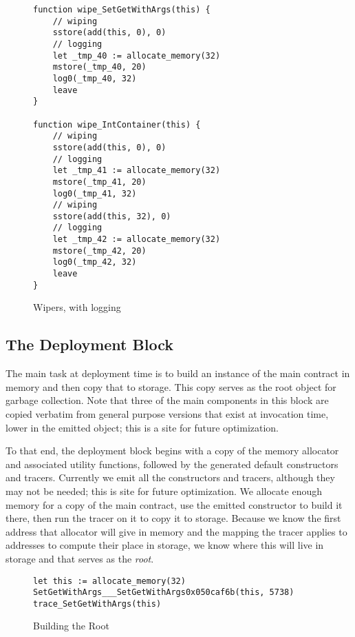 \begin{figure}[hbtp]
    \caption{Wipers, with logging}
    \label{code.5}
    \begin{lstlisting}[language=yul,frame=single]
function wipe_SetGetWithArgs(this) {
    // wiping
    sstore(add(this, 0), 0)
    // logging
    let _tmp_40 := allocate_memory(32)
    mstore(_tmp_40, 20)
    log0(_tmp_40, 32)
    leave
}

function wipe_IntContainer(this) {
    // wiping
    sstore(add(this, 0), 0)
    // logging
    let _tmp_41 := allocate_memory(32)
    mstore(_tmp_41, 20)
    log0(_tmp_41, 32)
    // wiping
    sstore(add(this, 32), 0)
    // logging
    let _tmp_42 := allocate_memory(32)
    mstore(_tmp_42, 20)
    log0(_tmp_42, 32)
    leave
}
    \end{lstlisting}
\end{figure}


\subsection{The Deployment Block}

The main task at deployment time is to build an instance of the main
contract in memory and then copy that to storage. This copy serves as the
root object for garbage collection. Note that three of the main components
in this block are copied verbatim from general purpose versions that exist
at invocation time, lower in the emitted object; this is a site for future
optimization.

To that end, the deployment block begins with a copy of the memory
allocator and associated utility functions, followed by the generated
default constructors and tracers. Currently we emit all the constructors
and tracers, although they may not be needed; this is site for future
optimization. We allocate enough memory for a copy of the main contract,
use the emitted constructor to build it there, then run the tracer on it to
copy it to storage. Because we know the first address that allocator will
give in memory and the mapping the tracer applies to addresses to compute
their place in storage, we know where this will live in storage and that
serves as the \emph{root}.

\begin{figure}[hbtp]
    \caption{Building the Root}
    \label{code.6}
    \begin{lstlisting}[language=yul,frame=single]
let this := allocate_memory(32)
SetGetWithArgs___SetGetWithArgs0x050caf6b(this, 5738)
trace_SetGetWithArgs(this)
    \end{lstlisting}
\end{figure}


